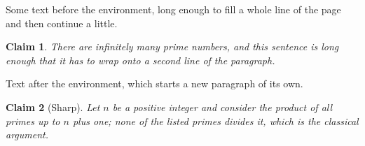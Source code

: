 \documentclass{article}
\theoremstyle{note}
\newtheorem{claim}{Claim}
\begin{document}
Some text before the environment, long enough to fill a whole line of the page and then continue a little.
\begin{claim}
There are infinitely many prime numbers, and this sentence is long enough that it has to wrap onto a second line of the paragraph.
\end{claim}
Text after the environment, which starts a new paragraph of its own.
\begin{claim}[Sharp]
Let $n$ be a positive integer and consider the product of all primes up to $n$ plus one; none of the listed primes divides it, which is the classical argument.
\end{claim}
\end{document}

